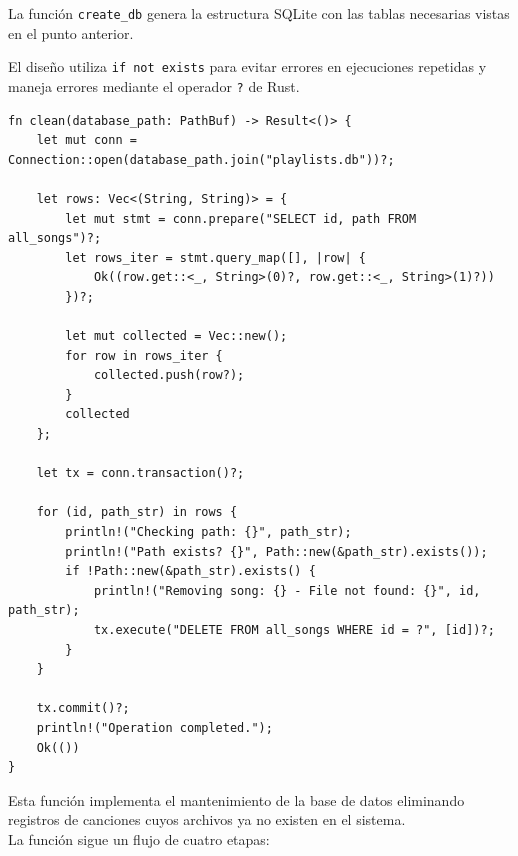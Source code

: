 \documentclass[11pt, a4paper]{article}
\begin{document}
            La función \verb|create_db| genera la estructura SQLite con las tablas necesarias vistas en el punto anterior.

            El diseño utiliza \verb|if not exists| para evitar errores en ejecuciones repetidas y maneja errores mediante el operador \verb|?| de Rust.

            \begin{lstlisting}[caption={fn clean()}]
fn clean(database_path: PathBuf) -> Result<()> {
    let mut conn = Connection::open(database_path.join("playlists.db"))?;

    let rows: Vec<(String, String)> = {
        let mut stmt = conn.prepare("SELECT id, path FROM all_songs")?;
        let rows_iter = stmt.query_map([], |row| {
            Ok((row.get::<_, String>(0)?, row.get::<_, String>(1)?))
        })?;

        let mut collected = Vec::new();
        for row in rows_iter {
            collected.push(row?);
        }
        collected
    };

    let tx = conn.transaction()?;

    for (id, path_str) in rows {
        println!("Checking path: {}", path_str);
        println!("Path exists? {}", Path::new(&path_str).exists()); 
        if !Path::new(&path_str).exists() {
            println!("Removing song: {} - File not found: {}", id, path_str);
            tx.execute("DELETE FROM all_songs WHERE id = ?", [id])?;
        }
    }

    tx.commit()?;
    println!("Operation completed.");
    Ok(())
}
            \end{lstlisting}

            Esta función implementa el mantenimiento de la base de datos eliminando registros de canciones cuyos archivos ya no existen en el sistema. \\

            La función sigue un flujo de cuatro etapas:
\end{document}
